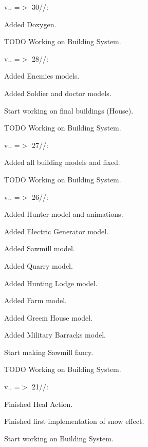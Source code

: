 v.. =\texorpdfstring{$>$}{>} 30//:\+
\begin{DoxyItemize}
\item Added Doxygen.
\item TODO Working on Building System.
\end{DoxyItemize}

v.. =\texorpdfstring{$>$}{>} 28//:\+
\begin{DoxyItemize}
\item Added Enemies models.
\item Added Soldier and doctor models.
\item Start working on final buildings (House).
\item TODO Working on Building System.
\end{DoxyItemize}

v.. =\texorpdfstring{$>$}{>} 27//:\+
\begin{DoxyItemize}
\item Added all building models and fixed.
\item TODO Working on Building System.
\end{DoxyItemize}

v.. =\texorpdfstring{$>$}{>} 26//:\+
\begin{DoxyItemize}
\item Added Hunter model and animations.
\item Added Electric Generator model.
\item Added Sawmill model.
\item Added Quarry model.
\item Added Hunting Lodge model.
\item Added Farm model.
\item Added Greem House model.
\item Added Military Barracks model.
\item Start making Sawmill fancy.
\item TODO Working on Building System.
\end{DoxyItemize}

v.. =\texorpdfstring{$>$}{>} 21//:\+
\begin{DoxyItemize}
\item Finished Heal Action.
\item Finished first implementation of snow effect.
\item Start working on Building System.
\end{DoxyItemize}

